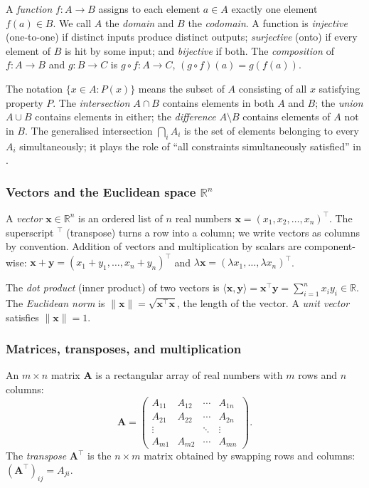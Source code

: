 \documentclass[11pt,a4paper]{article}
\theoremstyle{plain}
\theoremstyle{definition}
\theoremstyle{remark}
\begin{document}
A \emph{function} $f : A \to B$ assigns to each element $a \in A$
exactly one element $f(a) \in B$. We call $A$ the \emph{domain} and
$B$ the \emph{codomain}. A function is \emph{injective} (one-to-one)
if distinct inputs produce distinct outputs; \emph{surjective}
(onto) if every element of $B$ is hit by some input; and
\emph{bijective} if both. The \emph{composition} of $f : A \to B$ and
$g : B \to C$ is $g \circ f : A \to C$, $(g \circ f)(a) = g(f(a))$.

The notation $\{x \in A : P(x)\}$ means the subset of $A$ consisting
of all $x$ satisfying property $P$. The \emph{intersection}
$A \cap B$ contains elements in both $A$ and $B$; the \emph{union}
$A \cup B$ contains elements in either; the \emph{difference}
$A \setminus B$ contains elements of $A$ not in $B$. The generalised
intersection $\bigcap_{i} A_i$ is the set of elements belonging to
every $A_i$ simultaneously; it plays the role of ``all constraints
simultaneously satisfied'' in .

\subsubsection{Vectors and the Euclidean space $\mathbb{R}^n$}

A \emph{vector} $\mathbf{x} \in \mathbb{R}^n$ is an ordered list of
$n$ real numbers $\mathbf{x} = (x_1, x_2, \ldots, x_n)^\top$. The
superscript ${}^\top$ (transpose) turns a row into a column; we write
vectors as columns by convention. Addition of vectors and
multiplication by scalars are component-wise:
$\mathbf{x} + \mathbf{y} = (x_1 + y_1, \ldots, x_n + y_n)^\top$
and $\lambda\mathbf{x} = (\lambda x_1, \ldots, \lambda x_n)^\top$.

The \emph{dot product} (inner product) of two vectors is
$\langle \mathbf{x}, \mathbf{y}\rangle = \mathbf{x}^\top \mathbf{y}
= \sum_{i=1}^n x_i y_i \in \mathbb{R}$. The \emph{Euclidean norm}
is $\|\mathbf{x}\| = \sqrt{\mathbf{x}^\top\mathbf{x}}$, the length
of the vector. A \emph{unit vector} satisfies $\|\mathbf{x}\| = 1$.

\subsubsection{Matrices, transposes, and multiplication}

An $m \times n$ matrix $\mathbf{A}$ is a rectangular array of real
numbers with $m$ rows and $n$ columns:
\[
  \mathbf{A} =
  \begin{pmatrix}
    A_{11} & A_{12} & \cdots & A_{1n} \\
    A_{21} & A_{22} & \cdots & A_{2n} \\
    \vdots &        & \ddots & \vdots \\
    A_{m1} & A_{m2} & \cdots & A_{mn}
  \end{pmatrix}.
\]
The \emph{transpose} $\mathbf{A}^\top$ is the $n \times m$ matrix
obtained by swapping rows and columns: $(\mathbf{A}^\top)_{ij} =
A_{ji}$.
\end{document}
